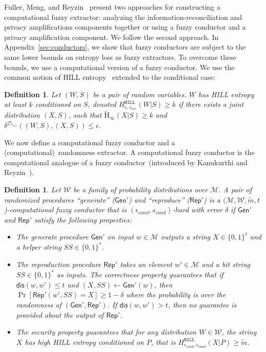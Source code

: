 \documentclass[11pt]{article}
\newcommand{\apref}[1]{\mbox{Appendix~\ref{#1}}}
\newcommand{\class}[1]{{\ensuremath{\mathsf{#1}}}}
\newcommand{\gen}{\ensuremath{\class{Gen}}\xspace}
\newcommand{\rep}{\ensuremath{\class{Rep}}\xspace}
\newcommand{\dis}{\ensuremath{\mathsf{dis}}}
\newcommand{\hill}{\ensuremath{\mathtt{HILL}}\xspace}
\newcommand{\Hav}{\tilde{\mathrm{H}}_\infty}
\newtheorem{definition}[theorem]{Definition}
\begin{document}
Fuller, Meng, and Reyzin~\cite{fuller2013computational} present two approaches for constructing a computational fuzzy extractor: analyzing the information-reconciliation and privacy amplifications components together or using a fuzzy conductor and a privacy amplification component.  We follow the second approach.
In \apref{sec:conductors}, we show that fuzzy conductors are subject to the same lower bounds on entropy loss as fuzzy extractors.  To overcome these bounds, we use a computational version of a fuzzy conductor.
We use the common notion of HILL entropy~\cite{DBLP:journals/siamcomp/HastadILL99} extended to the conditional case:
\begin{definition}
\label{def:hill ent}
Let $(W, S)$ be a pair of random variables.  $W$ has
\emph{HILL entropy} at least $k$ conditioned on $S$,
denoted $H^{\hill}_{\epsilon, s_{sec}}(W|S)\geq k$ if there exists a joint distribution $(X, S)$, such that $\Hav(X|S)\geq k$ and $\delta^{\mathcal{D}_{s_{sec}}} ((W, S),(X,S))\leq \epsilon$.
\end{definition}
We now define a computational fuzzy conductor and a (computational)~randomness extractor.  A computational fuzzy conductor is the computational analogue of a fuzzy conductor~(introduced by Kanukurthi and Reyzin~\cite{KanukurthiR09}).
\begin{definition}
\label{def:comp fuzzy cond}
Let $\mathcal{W}$ be a family of probability distributions over $\mathcal{M}$.  A pair of randomized procedures ``generate'' ($\gen'$) and ``reproduce'' ($\rep'$) is a $(\mathcal{M}, \mathcal{W}, \tilde{m}, t$)-computational fuzzy conductor that is $(\epsilon_{cond}, s_{cond})$-hard with error $\delta$ if $\gen'$ and $\rep'$ satisfy the following properties:
\begin{itemize}
\item The generate procedure $\gen'$ on input $w\in \mathcal{M}$ outputs a string $X\in\{0,1\}^\ell$ and a helper string $SS\in\{0,1\}^*$.
\item The reproduction procedure $\rep'$ takes an element $w'\in\mathcal{M}$ and a bit string $SS\in\{0,1\}^*$ as inputs.  The \emph{correctness} property guarantees that if $\dis(w, w')\leq t$ and $(X, SS)\leftarrow \gen'(w)$, then $\Pr[\rep'( w', SS) = X] \geq 1-\delta$ where the probability is over the randomness of $(\gen', \rep')$.
If $\dis(w, w') > t$, then no guarantee is provided about the output of $\rep'$.
\item The \emph{security} property guarantees that for any distribution $W\in \mathcal{W}$, the string $X$ has high HILL entropy conditioned on $P$, that is $H^{\hill}_{\epsilon_{cond}, s_{cond}}(X |P)\geq \tilde{m}$.
\end{itemize}
\end{definition}
\end{document}
